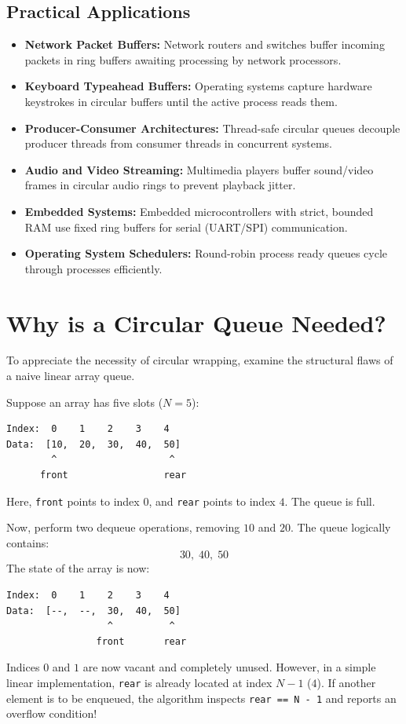 \subsection{Practical Applications}
\begin{itemize}
    \item \textbf{Network Packet Buffers:} Network routers and switches buffer incoming packets in ring buffers awaiting processing by network processors.
    \item \textbf{Keyboard Typeahead Buffers:} Operating systems capture hardware keystrokes in circular buffers until the active process reads them.
    \item \textbf{Producer-Consumer Architectures:} Thread-safe circular queues decouple producer threads from consumer threads in concurrent systems.
    \item \textbf{Audio and Video Streaming:} Multimedia players buffer sound/video frames in circular audio rings to prevent playback jitter.
    \item \textbf{Embedded Systems:} Embedded microcontrollers with strict, bounded RAM use fixed ring buffers for serial (UART/SPI) communication.
    \item \textbf{Operating System Schedulers:} Round-robin process ready queues cycle through processes efficiently.
\end{itemize}

\section{Why is a Circular Queue Needed?}

To appreciate the necessity of circular wrapping, examine the structural flaws of a naive linear array queue.

Suppose an array has five slots ($N=5$):
\begin{lstlisting}[style=pseudocode]
Index:  0    1    2    3    4
Data:  [10,  20,  30,  40,  50]
        ^                    ^
      front                 rear
\end{lstlisting}
Here, \texttt{front} points to index $0$, and \texttt{rear} points to index $4$. The queue is full.

Now, perform two dequeue operations, removing $10$ and $20$. The queue logically contains:
\[
30, \; 40, \; 50
\]
The state of the array is now:
\begin{lstlisting}[style=pseudocode]
Index:  0    1    2    3    4
Data:  [--,  --,  30,  40,  50]
                  ^          ^
                front       rear
\end{lstlisting}
Indices $0$ and $1$ are now vacant and completely unused. However, in a simple linear implementation, \texttt{rear} is already located at index $N-1$ ($4$). If another element is to be enqueued, the algorithm inspects \texttt{rear == N - 1} and reports an overflow condition!

